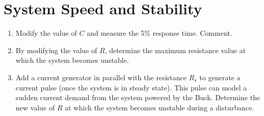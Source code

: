\section{System Speed and Stability}

\begin{enumerate}
    \item Modify the value of $C$ and measure the 5\% response time. Comment.
    \item By modifying the value of $R$, determine the maximum resistance value at which the system becomes unstable.
    \item Add a current generator in parallel with the resistance $R_s$ to generate a current pulse (once the system is in steady state). This pulse can model a sudden current demand from the system powered by the Buck. Determine the new value of $R$ at which the system becomes unstable during a disturbance.
\end{enumerate}